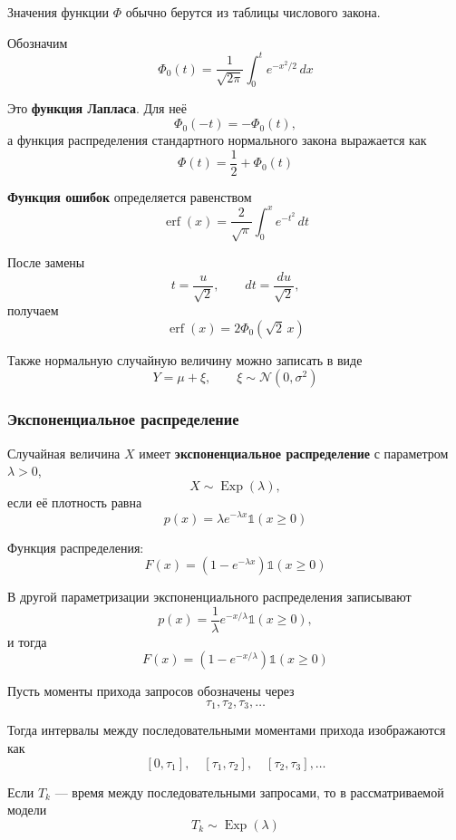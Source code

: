 \documentclass[12pt,a4paper]{article}
\begin{document}
\begin{note}

Значения функции $\Phi$ обычно берутся из таблицы числового закона.

\end{note}

Обозначим
\[
\Phi_0(t)
=
\frac{1}{\sqrt{2\pi}}
\int_0^t e^{-x^2/2}\,dx
\]

Это \textbf{функция Лапласа}. Для неё
\[
\Phi_0(-t)=-\Phi_0(t),
\]
а функция распределения стандартного нормального закона выражается как
\[
\Phi(t)=\frac12+\Phi_0(t)
\]

\textbf{Функция ошибок} определяется равенством
\[
\operatorname{erf}(x)
=
\frac{2}{\sqrt{\pi}}
\int_0^x e^{-t^2}\,dt
\]

После замены
\[
t=\frac{u}{\sqrt2},
\qquad
dt=\frac{du}{\sqrt2},
\]
получаем
\[
\operatorname{erf}(x)
=
2\Phi_0(\sqrt2\,x)
\]

Также нормальную случайную величину можно записать в виде
\[
Y=\mu+\xi,
\qquad
\xi\sim\mathcal{N}(0,\sigma^2)
\]

\subsubsection{Экспоненциальное распределение}

\begin{definition}

Случайная величина $X$ имеет \textbf{экспоненциальное распределение} с параметром $\lambda>0$,
\[
X\sim\operatorname{Exp}(\lambda),
\]
если её плотность равна
\[
p(x)
=
\lambda e^{-\lambda x}\mathds{1}(x\geq0)
\]

Функция распределения:
\[
F(x)
=
(1-e^{-\lambda x})\mathds{1}(x\geq0)
\]

\end{definition}

\begin{note}

В другой параметризации экспоненциального распределения записывают
\[
p(x)
=
\frac1\lambda e^{-x/\lambda}\mathds{1}(x\geq0),
\]
и тогда
\[
F(x)
=
(1-e^{-x/\lambda})\mathds{1}(x\geq0)
\]

\end{note}

\begin{example}

Пусть моменты прихода запросов обозначены через
\[
\tau_1,\tau_2,\tau_3,\ldots
\]

Тогда интервалы между последовательными моментами прихода изображаются как
\[
[0,\tau_1],\quad
[\tau_1,\tau_2],\quad
[\tau_2,\tau_3],\ldots
\]

Если $T_k$ --- время между последовательными запросами, то в рассматриваемой модели
\[
T_k\sim\operatorname{Exp}(\lambda)
\]

\end{example}
\end{document}
